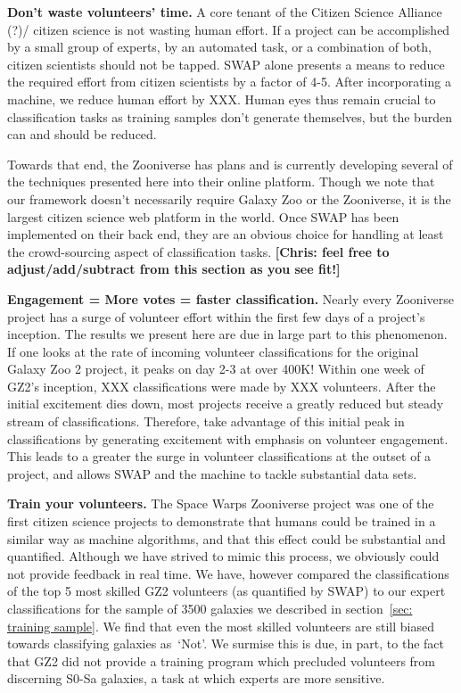 \documentclass[twocolumn]{aastex6}
\newcommand{\notfeat}{`Not'}
\begin{document}
\textbf{Don't waste volunteers' time.} A core tenant of the Citizen Science Alliance (?)/
citizen science 
 is not wasting human effort. If a project can be accomplished by a small 
group of experts, by an automated task, or a combination of both, citizen scientists
should not be tapped. SWAP alone presents a means to reduce the required 
effort from citizen scientists by a factor of 4-5. After incorporating a machine, we 
reduce human effort by XXX. Human eyes thus remain crucial to classification tasks
as training samples don't generate themselves, but the burden can and should be reduced. 

Towards that end, the Zooniverse has plans and is currently developing
several of the techniques presented here into their online platform. Though we 
note that our framework doesn't necessarily require Galaxy Zoo or the Zooniverse, 
it is the largest citizen science web platform in the world. Once SWAP has been
implemented on their back end, they are an obvious choice for handling at least
the crowd-sourcing aspect of classification tasks. 
\textbf{[Chris: feel free to adjust/add/subtract from this section as you see fit!]}


\textbf{Engagement = More votes = faster classification.}
Nearly every Zooniverse project has a surge of volunteer effort within the first 
few days of a project's inception. The results we present here are due in large 
part to this phenomenon. If one looks at the rate of incoming volunteer classifications
for the original Galaxy Zoo 2 project, it peaks on day 2-3 at over 400K! Within one
week of GZ2's inception, XXX classifications were made by XXX volunteers. 
 After the initial excitement dies down, most projects receive
a greatly reduced but steady stream of classifications. Therefore, take advantage
 of this initial peak in classifications by generating excitement with emphasis on 
volunteer engagement. This leads to a greater the surge in volunteer classifications 
at the outset of a project, and allows SWAP and the machine to tackle substantial data sets.  


\textbf{Train your volunteers.}
The Space Warps Zooniverse project was one of the first citizen science projects
to demonstrate that humans could be trained in a similar way as machine algorithms, 
and that this effect could be substantial and quantified.  Although we have strived to 
mimic this process, we obviously could not provide feedback in real time. We have, 
however compared the classifications of the top 5 most skilled GZ2 volunteers
(as quantified by SWAP) to our expert classifications for the sample of 3500 galaxies 
we described in section~\ref{sec: training sample}. We find that even the most
skilled volunteers are still biased towards classifying galaxies as~\notfeat.
We surmise this is due, in part, to the fact that GZ2 did not provide a training 
program which precluded volunteers from discerning S0-Sa galaxies, a task at 
which experts are more sensitive.  
\end{document}

